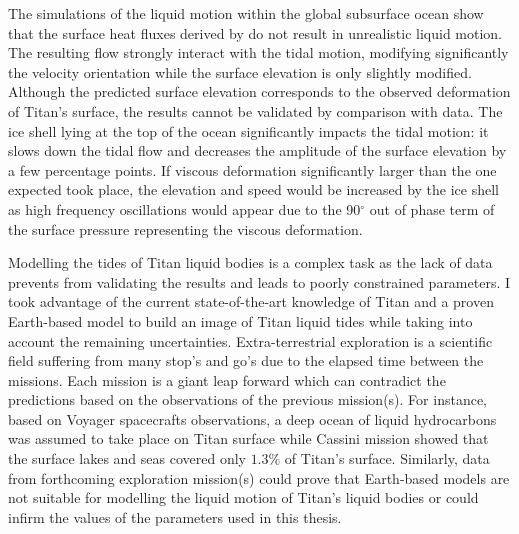  The simulations of the liquid motion within the global subsurface ocean show that the surface heat fluxes derived by \cite{kvorka2018does} do not result in unrealistic liquid motion. The resulting flow strongly interact with the tidal motion, modifying significantly the velocity orientation while the surface elevation is only slightly modified. Although the predicted surface elevation corresponds to the observed deformation of Titan's surface, the results cannot be validated by comparison with data. The ice shell lying at the top of the ocean significantly impacts the tidal motion: it slows down the tidal flow and decreases the amplitude of the surface elevation by a few percentage points. If viscous deformation significantly larger than the one expected took place, the elevation and speed would be increased by the ice shell as high frequency oscillations would appear due to the 90$^\circ$ out of phase term of the surface pressure representing the viscous deformation.
 
Modelling the tides of Titan liquid bodies is a complex task as the lack of data prevents from validating the results and leads to poorly constrained parameters. I took advantage of the current state-of-the-art knowledge of Titan and a proven Earth-based model to build an image of Titan liquid tides while taking into account the remaining uncertainties. Extra-terrestrial exploration is a scientific field suffering from many stop's and go's due to the elapsed time between the missions. Each mission is a giant leap forward which can contradict the predictions based on the observations of the previous mission(s). For instance, based on Voyager spacecrafts observations, a deep ocean of liquid hydrocarbons was assumed to take place on Titan surface while Cassini mission showed that the surface lakes and seas covered only $1.3\%$ of Titan's surface. Similarly, data from forthcoming exploration mission(s) could prove that Earth-based models are not suitable for modelling the liquid motion of Titan's liquid bodies or could infirm the values of the parameters used in this thesis. 

